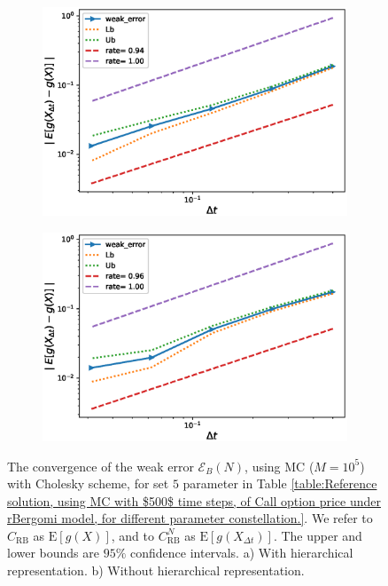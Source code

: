 \documentclass[11pt]{article}
\newcommand{\expt}[1]{\mathrm{E}\left[#1\right]}
\begin{document}
\FloatBarrier
\begin{figure}[h!]
	\centering
	\begin{subfigure}{.5\textwidth}
		\centering
		\includegraphics[width=1\linewidth]{./figures/rBergomi_weak_error_cholesky/weak_convergence_order_Bergomi_H_043_K_1_M_10_5_CI_relative_cholesky_hierarchical}
		\caption{}
		\label{fig:sub3}
	\end{subfigure}%
	\begin{subfigure}{.5\textwidth}
		\centering
		\includegraphics[width=1\linewidth]{./figures/rBergomi_weak_error_cholesky/weak_convergence_order_Bergomi_H_043_K_1_M_10_5_CI_relative_cholesky_non_hierarchical}
		\caption{}
		\label{fig:sub4}
	\end{subfigure}
	
	\caption{The  convergence of the weak error $\mathcal{E}_B(N)$, using MC ($M=10^5$) with Cholesky scheme, for set $5$ parameter in Table \ref{table:Reference solution, using MC with $500$ time steps, of Call option price under rBergomi model, for different parameter constellation.}. We refer to $C_{\text{RB}}$ as $\expt{g(X)}$, and to $C_{\text{RB}}^{N}$ as  $\expt{g(X_{\Delta t})}$. The upper and lower bounds are $95\%$ confidence intervals. a) With hierarchical representation.  b) Without hierarchical representation.}
	\label{fig:Weak_rate_set1_set_5_without_rich}
\end{figure}
\FloatBarrier
\end{document}
